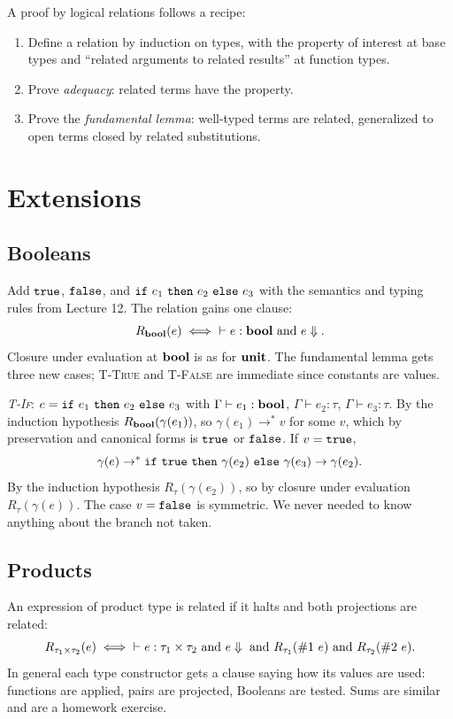 A proof by logical relations follows a recipe:
\begin{enumerate}
  \item Define a relation by induction on types, with the property of interest at base
        types and ``related arguments to related results'' at function types.
  \item Prove \emph{adequacy}: related terms have the property.
  \item Prove the \emph{fundamental lemma}: well-typed terms are related, generalized to
        open terms closed by related substitutions.
\end{enumerate}
 
\section{Extensions}
 
\subsection{Booleans}
 
Add $\mathtt{true}$, $\mathtt{false}$, and $\mathtt{if}\ e_1\ \mathtt{then}\ e_2\ \mathtt{else}\
e_3$ with the semantics and typing rules from Lecture 12. The relation gains one
clause:
\[
R_{\mathbf{bool}}(e) \iff\ \vdash e : \mathbf{bool} \text{ and } e \Downarrow.
\]
Closure under evaluation at $\mathbf{bool}$ is as for $\mathbf{unit}$. The fundamental lemma
gets three new cases; \textsc{T-True} and \textsc{T-False} are immediate since
constants are values.
 
\emph{\textsc{T-If}}: $e = \ttkw{if}\ e_1\ \ttkw{then}\ e_2\ \ttkw{else}\ e_3$ with
$\Gamma \vdash e_1 : \mathbf{bool}$, $\Gamma \vdash e_2 : \tau$, $\Gamma \vdash e_3 : \tau$.
By the induction hypothesis $R_{\mathbf{bool}}(\gamma(e_1))$, so $\gamma(e_1) \to^* v$ for
some $v$, which by preservation and canonical forms is $\mathtt{true}$ or
$\mathtt{false}$. If $v = \mathtt{true}$,
\[
\gamma(e) \to^* \ttkw{if}\ \ttkw{true}\ \ttkw{then}\ \gamma(e_2)\ \ttkw{else}\ \gamma(e_3) \to \gamma(e_2).
\]
By the induction hypothesis $R_\tau(\gamma(e_2))$, so by closure under evaluation
$R_\tau(\gamma(e))$. The case $v = \mathtt{false}$ is symmetric. We never needed to know
anything about the branch not taken.
 
\subsection{Products}
 
An expression of product type is related if it halts and both projections are related:
\[
R_{\tau_1 \times \tau_2}(e) \iff\ \vdash e : \tau_1 \times \tau_2 \text{ and } e \halts \text{ and } R_{\tau_1}(\#1\ e) \text{ and } R_{\tau_2}(\#2\ e).
\]
In general each type constructor gets a clause saying how its values are used:
functions are applied, pairs are projected, Booleans are tested. Sums are similar and
are a homework exercise.
 
